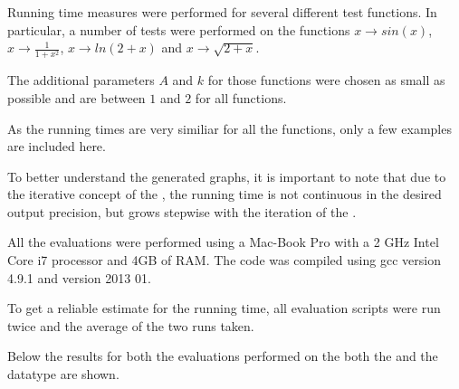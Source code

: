     Running time measures were performed for several different test functions.
 		In particular, a number of tests were performed on the functions $x \to sin(x)$, $x \to \frac{1}{1+x^2}$, $x \to ln(2+x)$ and $x \to \sqrt{2+x}$. 
    
    The additional parameters $A$ and $k$ for those functions were chosen as small as possible and are between $1$ and $2$ for all functions.

    As the running times are very similiar for all the functions, only a few examples are included here.

 		To better understand the generated graphs, it is important to note that due to the iterative concept of the \irram,
    the running time is not continuous in the desired output precision, but grows stepwise with the iteration of the \irram.

    All the evaluations were performed using a Mac-Book Pro with a 2 GHz Intel Core i7 processor and 4GB of RAM.
    The code was compiled using gcc version 4.9.1 and \irram version 2013 01.

    To get a reliable estimate for the running time, all evaluation scripts were run twice and 
    the average of the two runs taken.

    Below the results for both the evaluations performed on the both the \baana and the \anarect datatype are shown. 
		\subsection{\baana}

